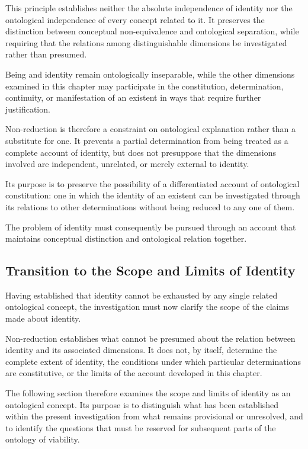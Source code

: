 This principle establishes neither the absolute
independence of identity nor the ontological independence
of every concept related to it. It preserves the
distinction between conceptual non-equivalence and
ontological separation, while requiring that the
relations among distinguishable dimensions be
investigated rather than presumed.

Being and identity remain ontologically inseparable,
while the other dimensions examined in this chapter
may participate in the constitution, determination,
continuity, or manifestation of an existent in ways
that require further justification.

Non-reduction is therefore a constraint on ontological
explanation rather than a substitute for one. It
prevents a partial determination from being treated
as a complete account of identity, but does not
presuppose that the dimensions involved are
independent, unrelated, or merely external to identity.

Its purpose is to preserve the possibility of a
differentiated account of ontological constitution:
one in which the identity of an existent can be
investigated through its relations to other
determinations without being reduced to any one
of them.

The problem of identity must consequently be pursued
through an account that maintains conceptual
distinction and ontological relation together.

\subsection{Transition to the Scope and Limits of Identity}

Having established that identity cannot be exhausted
by any single related ontological concept, the
investigation must now clarify the scope of the claims
made about identity.

Non-reduction establishes what cannot be presumed
about the relation between identity and its associated
dimensions. It does not, by itself, determine the
complete extent of identity, the conditions under
which particular determinations are constitutive,
or the limits of the account developed in this chapter.

The following section therefore examines the scope
and limits of identity as an ontological concept.
Its purpose is to distinguish what has been established
within the present investigation from what remains
provisional or unresolved, and to identify the questions
that must be reserved for subsequent parts of the
ontology of viability.

